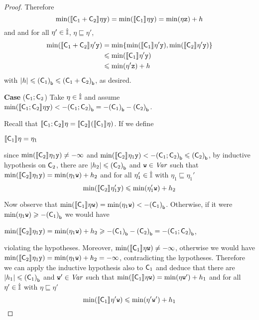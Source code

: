 \begin{proof}
  Therefore 
  \[
  \min(\semi{\com_1 \ndet \com_2}\eta \var[y])
  = \min(\semi{\com_1}\eta \var[y]) = \min(\eta \var[z]) + h
  \]
  and and for
  all \(\eta' \in \inte\), \(\eta \sqsubseteq \eta'\),
  \begin{align*}
    \min(\semi{\com_1 \ndet \com_2}\eta' \var[y])
    &= \min\{ \min(\semi{\com_1}\eta' \var[y]),  \min(\semi{\com_2}\eta' \var[y])\}\\
    & \leq \min(\semi{\com_1}\eta' \var[y])\\
    & \leq \min(\eta' \var[z]) + h
  \end{align*}
  with \(|h| \leq \lbound{\com_1} \leq \lbound{\com_1 \ndet \com_2}\), as desired.

  
  \medskip
  
  \noindent
  \textbf{Case} (\(\com_1 \seq \com_2\))
  Take \(\eta \in \inte\) and assume
  \(\min(\semi{\com_1 \seq \com_2}\eta\var[y]) < -\lbound{\com_1 \seq
    \com_2} = - \lbound{\com_1} - \lbound{\com_2}\).
  
  Recall that
  \(\semi{\com_1 \seq \com_2} \eta = \semi{\com_2}(\semi{\com_1}\eta)\).
  If we define
  \begin{center}
    \(\semi{\com_1} \eta = \eta_1\)
  \end{center}
  since \(\min(\semi{\com_2}\eta_1 \var[y]) \neq -\infty\) and
  \(\min(\semi{\com_2} \eta_1 \var[y]) < -\lbound{\com_1 \seq \com_2}
  \leq \lbound{\com_2}\), by inductive hypothesis on \(\com_2\), there
  are \(|h_2| \leq \lbound{\com_2}\) and \(\var[w] \in \Var\) such that
  \(\min(\semi{\com_2} \eta_1 \var[y]) = \min(\eta_1 \var[w]) + h_2\)
  and for all \(\eta_1' \in \inte\) with
  \(\eta_1 \sqsubseteq \eta_1'\)
  \begin{equation}
    \label{eq:seq2min}
    \min(\semi{\com_2} \eta_1' \var[y]) \leq \min(\eta_1' \var[w]) + h_2
  \end{equation}
  
  Now observe that
  \(\min(\semi{\com_1}\eta \var[w]) = \min(\eta_1 \var[w]) < -
  \lbound{\com_1}\). Otherwise, if it were
  \(\min(\eta_1 \var[w]) \geq -\lbound{\com_1}\) we would have
  \begin{center}
    \(\min(\semi{\com_2}\eta_1 \var[y]) = \min(\eta_1 \var[w]) + h_2 \geq
    - \lbound{\com_1} - \lbound{\com_2} = - \lbound{\com_1 \seq \com_2}\),
  \end{center}
  violating the hypotheses. Moreover,
  \(\min(\semi{\com_1}\eta \var[w]) \neq - \infty\), otherwise we
  would have
  \(\min(\semi{\com_2} \eta_1 \var[y]) = \min(\eta_1 \var[w]) + h_2 =
  - \infty\), contradicting the hypotheses.  Therefore we can apply
  the inductive hypothesis also to \(\com_1\) and deduce that there
  are \(|h_1| \leq \lbound{\com_1}\) and \(\var[w]' \in \Var\) such
  that
  \(\min(\semi{\com_1} \eta \var[w]) = \min(\eta \var[w]') + h_1\) and
  for all \(\eta' \in \inte\) with \(\eta \sqsubseteq \eta'\)
  \begin{equation}
    \label{eq:seq1min}
    \min(\semi{\com_1} \eta' \var[w]) \leq \min(\eta' \var[w]') + h_1
  \end{equation}


\end{proof}
